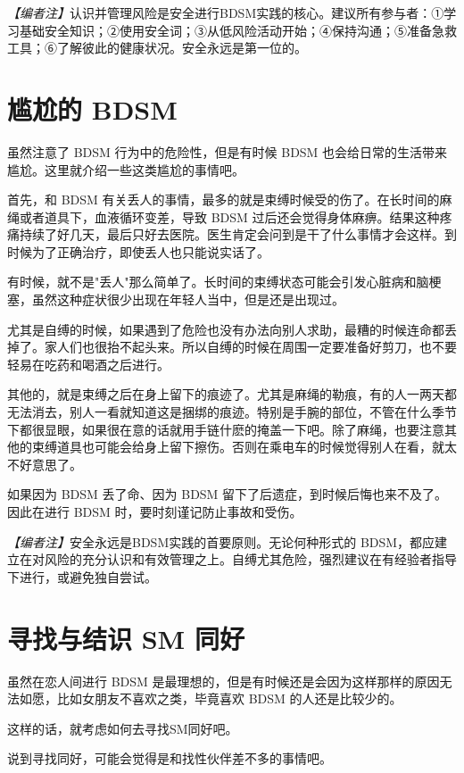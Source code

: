 \documentclass[12pt,UTF8]{ctexbook}
\begin{document}
\textit{【编者注】}认识并管理风险是安全进行BDSM实践的核心。建议所有参与者：①学习基础安全知识；②使用安全词；③从低风险活动开始；④保持沟通；⑤准备急救工具；⑥了解彼此的健康状况。安全永远是第一位的。

\section{尴尬的 BDSM}

虽然注意了 BDSM 行为中的危险性，但是有时候 BDSM 也会给日常的生活带来尴尬。这里就介绍一些这类尴尬的事情吧。

首先，和 BDSM 有关丢人的事情，最多的就是束缚时候受的伤了。在长时间的麻绳或者道具下，血液循环变差，导致 BDSM 过后还会觉得身体麻痹。结果这种疼痛持续了好几天，最后只好去医院。医生肯定会问到是干了什么事情才会这样。到时候为了正确治疗，即使丢人也只能说实话了。

有时候，就不是"丢人"那么简单了。长时间的束缚状态可能会引发心脏病和脑梗塞，虽然这种症状很少出现在年轻人当中，但是还是出现过。

尤其是自缚的时候，如果遇到了危险也没有办法向别人求助，最糟的时候连命都丢掉了。家人们也很抬不起头来。所以自缚的时候在周围一定要准备好剪刀，也不要轻易在吃药和喝酒之后进行。

其他的，就是束缚之后在身上留下的痕迹了。尤其是麻绳的勒痕，有的人一两天都无法消去，别人一看就知道这是捆绑的痕迹。特别是手腕的部位，不管在什么季节下都很显眼，如果很在意的话就用手链什麽的掩盖一下吧。除了麻绳，也要注意其他的束缚道具也可能会给身上留下擦伤。否则在乘电车的时候觉得别人在看，就太不好意思了。

如果因为 BDSM 丢了命、因为 BDSM 留下了后遗症，到时候后悔也来不及了。因此在进行 BDSM 时，要时刻谨记防止事故和受伤。

\textit{【编者注】}安全永远是BDSM实践的首要原则。无论何种形式的 BDSM，都应建立在对风险的充分认识和有效管理之上。自缚尤其危险，强烈建议在有经验者指导下进行，或避免独自尝试。

\section{寻找与结识 SM 同好}

虽然在恋人间进行 BDSM 是最理想的，但是有时候还是会因为这样那样的原因无法如愿，比如女朋友不喜欢之类，毕竟喜欢 BDSM 的人还是比较少的。

这样的话，就考虑如何去寻找SM同好吧。

说到寻找同好，可能会觉得是和找性伙伴差不多的事情吧。
\end{document}

